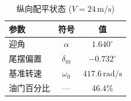 \begin{table}[H]
\centering
\caption{纵向配平状态 ($V=24\,\text{m/s}$)}
\label{tab:trim}
\small
\begin{tabular}{l c c}
\toprule
\textbf{参数} & \textbf{符号} & \textbf{值} \\
\midrule
迎角 & $\alpha$ & $1.640^\circ$ \\
尾摆偏置 & $\delta_{t0}$ & $-0.732^\circ$ \\
基准转速 & $\omega_0$ & $417.6\,\text{rad/s}$ \\
油门百分比 & — & $46.4\%$ \\
\bottomrule
\end{tabular}
\end{table}
